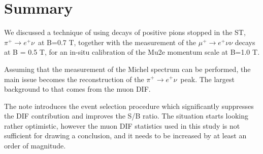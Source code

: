 \documentclass[12pt]{article}
\newcommand {\piplusenu} {\mbox{$\pi^+ \to e^+ \nu$}}
\begin{document}






% 





% 
% 





\section {Summary}

We discussed a technique of using decays of positive pions stopped in the ST,
\piplusenu\ at B=0.7 T, together with the measurement of the $\mu^+ \to e^+ \nu \nu$
decays at B = 0.5 T, for an in-situ calibration of the Mu2e momentum scale at B=1.0 T.

Assuming that the measurement of the Michel spectrum can be performed,
the main issue becomes the reconstruction of the \piplusenu\ peak.
The largest background to that comes from the muon DIF. 

The note introduces the event selection procedure which significantly
suppresses the DIF contribution and improves the S/B ratio. 
%
The situation starts looking rather optimistic, however the muon DIF statistics
used in this study is not sufficient for drawing a conclusion, and it needs
to be increased by at least an order of magnitude.
%
\newpage





\end{document}
